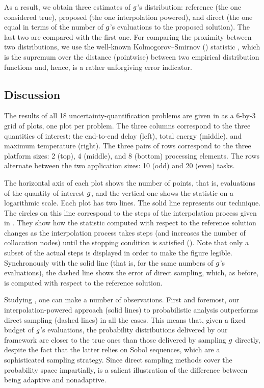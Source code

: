 As a result, we obtain three estimates of $g$'s distribution: reference (the
one considered true), proposed (the one interpolation powered), and direct (the
one equal in terms of the number of $g$'s evaluations to the proposed
solution). The last two are compared with the first one. For comparing the
proximity between two distributions, we use the well-known Kolmogorov--Smirnov
() statistic \cite{rao2009}, which is the supremum over the distance
(pointwise) between two empirical distribution functions and, hence, is a rather
unforgiving error indicator.


\subsection{Discussion}
The results of all 18 uncertainty-quantification problems are given in
 as a 6-by-3 grid of plots, one plot per problem. The three
columns correspond to the three quantities of interest: the end-to-end delay
(left), total energy (middle), and maximum temperature (right). The three pairs
of rows correspond to the three platform sizes: 2 (top), 4 (middle), and 8
(bottom) processing elements. The rows alternate between the two application
sizes: 10 (odd) and 20 (even) tasks.

The horizontal axis of each plot shows the number of points, that is,
evaluations of the quantity of interest $g$, and the vertical one shows the
 statistic on a logarithmic scale. Each plot has two lines. The solid
line represents our technique. The circles on this line correspond to the steps
of the interpolation process given in . They show how the
 statistic computed with respect to the reference solution changes as the
interpolation process takes steps (and increases the number of collocation
nodes) until the stopping condition is satisfied (). Note that
only a subset of the actual steps is displayed in order to make the figure
legible. Synchronously with the solid line (that is, for the same numbers of
$g$'s evaluations), the dashed line shows the error of direct sampling, which,
as before, is computed with respect to the reference solution.

Studying , one can make a number of observations. First and
foremost, our interpolation-powered approach (solid lines) to probabilistic
analysis outperforms direct sampling (dashed lines) in all the cases. This means
that, given a fixed budget of $g$'s evaluations, the probability distributions
delivered by our framework are closer to the true ones than those delivered by
sampling $g$ directly, despite the fact that the latter relies on Sobol
sequences, which are a sophisticated sampling strategy. Since direct sampling
methods cover the probability space impartially,  is a salient
illustration of the difference between being adaptive and nonadaptive.

